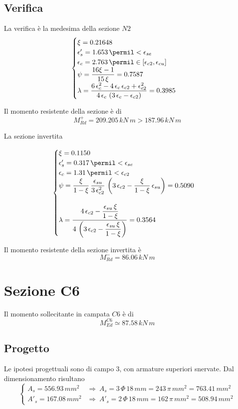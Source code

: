 \subsection{Verifica}
La verifica è la medesima della sezione $N2$
\[
\begin{cases}
	\xi = 0.21648\\
	\epsilon'_s = 1.653\,\permil < \epsilon_{se}\\
	\epsilon_c = 2.763\,\permil \in \left[\epsilon_{c2}, \epsilon_{cu}\right]\\
	\psi = \dfrac{16\xi -1}{15\,\xi} =0.7587 \\
	\lambda = \dfrac{6\,\epsilon_{c}^2 - 4\,\epsilon_{c}\,\epsilon_{c2} + \epsilon_{c2}^2}{4\,\epsilon_{c}\,\left(3\,\epsilon_c - \epsilon_{c2}\right)} = 0.3985
\end{cases}
\]

Il momento resistente della sezione è di
\[
M_{Rd}^+ = 209.205\,kN\,m > 187.96\,kN\,m
\]

La sezione invertita

\[
\begin{cases}
	\xi = 0.1150\\
	\epsilon'_s = 0.317\,\permil<\epsilon_{se}\\
	\epsilon_c = 1.31\,\permil < \epsilon_{c2}\\
	\psi = \dfrac{\xi}{1-\xi}\,\dfrac{\epsilon_{su}}{3\,\epsilon_{c2}^2}\,\left(3\,\epsilon_{c2} - \dfrac{\xi}{1-\xi}\,\epsilon_{su}\right) = 0.5090\\\\
	\lambda = \dfrac{4\,\epsilon_{c2} - \dfrac{\epsilon_{su}\,\xi}{1-\xi}}{4\,\left(3\,\epsilon_{c2} - \dfrac{\epsilon_{su}\,\xi}{1-\xi}\right)} = 0.3564
\end{cases}
\]

Il momento resistente della sezione invertita è
\[
M_{Rd}^- = 86.06\,kN\,m
\]

\section{Sezione C6}
Il momento sollecitante in campata $C6$ è di 
\[
M_{Ed}^{C6} \simeq 87.58\,kN\,m
\]
\subsection{Progetto}
Le ipotesi progettuali sono di campo 3, con armature superiori snervate. Dal dimensionamento risultano
\[
\begin{cases}
	A_s = 556.93\,mm^2 &\Longrightarrow~A_s = 3\,\Phi\,18\,mm = 243\,\pi\,mm^2 = 763.41\,mm^2\\
	A'_s = 167.08\,mm^2 &\Longrightarrow~ A'_s = 2\,\Phi\,18\,mm = 162\,\pi\,mm^2 = 508.94\,mm^2
\end{cases}
\]

